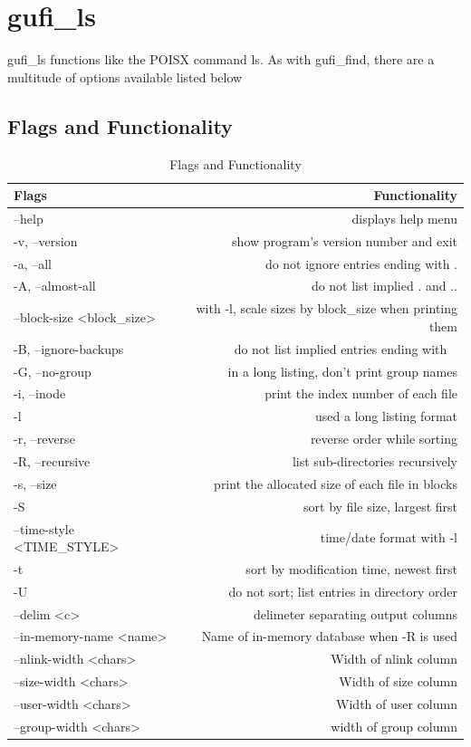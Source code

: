 \documentclass{article}
\begin{document}
\clearpage

\section{gufi\_ls}
gufi\_ls functions like the POISX command ls. As with gufi\_find, there are a multitude of options available listed below

\subsection{Flags and Functionality}
\begin{table} [h]
\centering
\begin{tabular}{l|r}
Flags & Functionality\\\hline
--help & displays help menu\\
-v, --version & show program's version number and exit \\
-a, --all & do not ignore entries ending with .\\
-A, --almost-all & do not list implied . and .. \\
--block-size \textless block\_size\textgreater & with -l, scale sizes by block\_size when printing them \\
-B, --ignore-backups & do not list implied entries ending with ~\\
-G, --no-group & in a long listing, don't print group names\\
-i, --inode & print the index number of each file\\
-l & used a long listing format\\
-r, --reverse & reverse order while sorting\\
-R, --recursive & list sub-directories recursively\\
-s, --size & print the allocated size of each file in blocks\\
-S & sort by file size, largest first \\
--time-style \textless TIME\_STYLE\textgreater & time/date format with -l\\
-t & sort by modification time, newest first\\
-U & do not sort; list entries in directory order\\
--delim \textless c\textgreater & delimeter separating output columns\\ 
--in-memory-name \textless name\textgreater & Name of in-memory database when -R is used\\
--nlink-width \textless chars\textgreater & Width of nlink column\\
--size-width \textless chars\textgreater & Width of size column\\
--user-width \textless chars\textgreater & Width of user column\\
--group-width \textless chars\textgreater & width of group column
\end{tabular}
\caption{\label{tab:widgets}Flags and Functionality}
\end{table}
\end{document}
